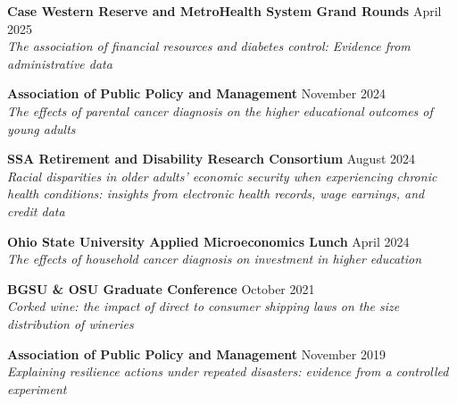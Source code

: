 \textbf{Case Western Reserve and MetroHealth System Grand Rounds} \hfill April 2025 \\
\textit{The association of financial resources and diabetes control: Evidence from administrative data}

\bigskip
\textbf{Association of Public Policy and Management} \hfill November 2024 \\
\textit{The effects of parental cancer diagnosis on the higher educational outcomes of young adults}

\bigskip
\textbf{SSA Retirement and Disability Research Consortium} \hfill August 2024 \\
\textit{Racial disparities in older adults' economic security when experiencing chronic health conditions: insights from electronic health records, wage earnings, and credit data}

\bigskip
\textbf{Ohio State University Applied Microeconomics Lunch} \hfill April 2024 \\
\textit{The effects of household cancer diagnosis on investment in higher education}

\bigskip
\textbf{BGSU \& OSU Graduate Conference} \hfill October 2021 \\
\textit{Corked wine: the impact of direct to consumer shipping laws on the size distribution of wineries}

\bigskip
\textbf{Association of Public Policy and Management} \hfill November 2019 \\
\textit{Explaining resilience actions under repeated disasters: evidence from a controlled experiment}